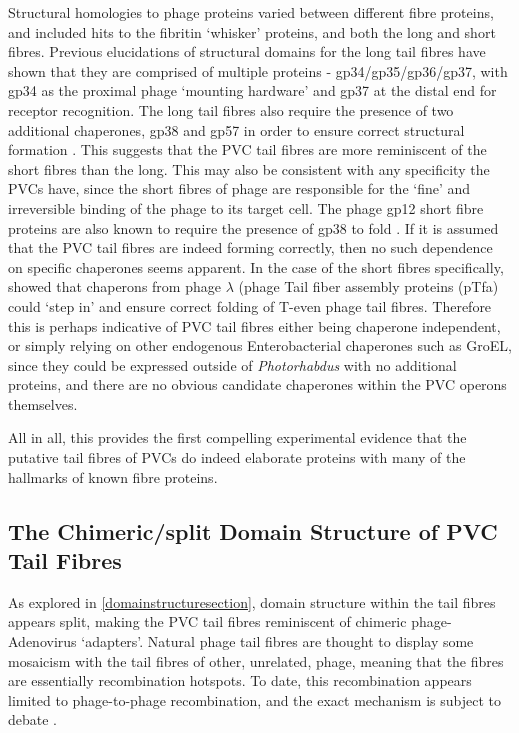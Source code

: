 Structural homologies to phage proteins varied between different fibre proteins, and included hits to the fibritin `whisker' proteins, and both the long and short fibres. Previous elucidations of structural domains for the long tail fibres have shown that they are comprised of multiple proteins - gp34/gp35/gp36/gp37, with gp34 as the proximal phage `mounting hardware' and gp37 at the distal end for receptor recognition. The long tail fibres also require the presence of two additional chaperones, gp38 and gp57 in order to ensure correct structural formation \citep{Granell2014, Bartual2010}. This suggests that the PVC tail fibres are more reminiscent of the short fibres than the long. This may also be consistent with any specificity the PVCs have, since the short fibres of phage are responsible for the `fine' and irreversible binding of the phage to its target cell. The phage gp12 short fibre proteins are also known to require the presence of gp38 to fold \citep{Hashemolhosseini1996}. If it is assumed that the PVC tail fibres are indeed forming correctly, then no such dependence on specific chaperones seems apparent. In the case of the short fibres specifically, \cite{Hashemolhosseini1996} showed that chaperons from phage $\lambda$ (phage Tail fiber assembly proteins (pTfa) could `step in' and ensure correct folding of T-even phage tail fibres. Therefore this is perhaps indicative of PVC tail fibres either being chaperone independent, or simply relying on other endogenous Enterobacterial chaperones such as GroEL, since they could be expressed outside of \emph{Photorhabdus} with no additional proteins, and there are no obvious candidate chaperones within the PVC operons themselves. 

All in all, this provides the first compelling experimental evidence that the putative tail fibres of PVCs do indeed elaborate proteins with many of the hallmarks of known fibre proteins.

\subsection{The Chimeric/split Domain Structure of PVC Tail Fibres}
As explored in \vref{domainstructuresection}, domain structure within the tail fibres appears split, making the PVC tail fibres reminiscent of chimeric phage-Adenovirus `adapters'. Natural phage tail fibres are thought to display some mosaicism with the tail fibres of other, unrelated, phage, meaning that the fibres are essentially recombination hotspots. To date, this recombination appears limited to phage-to-phage recombination, and the exact mechanism is subject to debate \citep{Sandmeler1994}. 

